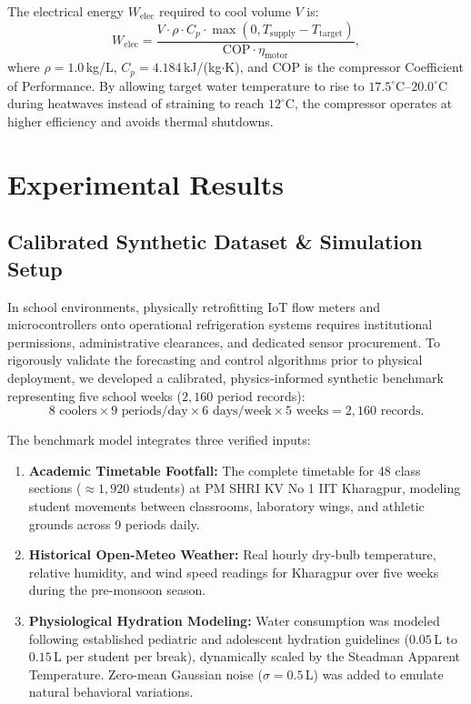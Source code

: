 \documentclass[conference]{IEEEtran}
\begin{document}
The electrical energy $W_{\text{elec}}$ required to cool volume $V$ is:
\begin{equation}
W_{\text{elec}} = \frac{V \cdot \rho \cdot C_p \cdot \max(0, T_{\text{supply}} - T_{\text{target}})}{\text{COP} \cdot \eta_{\text{motor}}},
\end{equation}
where $\rho = 1.0\,$kg/L, $C_p = 4.184\,$kJ/(kg$\cdot$K), and $\text{COP}$ is the compressor Coefficient of Performance. By allowing target water temperature to rise to $17.5^\circ\text{C}$--$20.0^\circ\text{C}$ during heatwaves instead of straining to reach $12^\circ\text{C}$, the compressor operates at higher efficiency and avoids thermal shutdowns.

\section{Experimental Results}

\subsection{Calibrated Synthetic Dataset \& Simulation Setup}
In school environments, physically retrofitting IoT flow meters and microcontrollers onto operational refrigeration systems requires institutional permissions, administrative clearances, and dedicated sensor procurement. To rigorously validate the forecasting and control algorithms prior to physical deployment, we developed a calibrated, physics-informed synthetic benchmark representing five school weeks ($2,160$ period records):
\begin{equation*}
8 \text{ coolers} \times 9 \text{ periods/day} \times 6 \text{ days/week} \times 5 \text{ weeks} = 2,160 \text{ records}.
\end{equation*}

The benchmark model integrates three verified inputs:
\begin{enumerate}
    \item \textbf{Academic Timetable Footfall:} The complete timetable for 48 class sections (${\approx}1,920$ students) at PM SHRI KV No 1 IIT Kharagpur, modeling student movements between classrooms, laboratory wings, and athletic grounds across 9 periods daily.
    \item \textbf{Historical Open-Meteo Weather:} Real hourly dry-bulb temperature, relative humidity, and wind speed readings for Kharagpur over five weeks during the pre-monsoon season.
    \item \textbf{Physiological Hydration Modeling:} Water consumption was modeled following established pediatric and adolescent hydration guidelines ($0.05$\,L to $0.15$\,L per student per break), dynamically scaled by the Steadman Apparent Temperature. Zero-mean Gaussian noise ($\sigma = 0.5\,$L) was added to emulate natural behavioral variations.
\end{enumerate}
\end{document}
